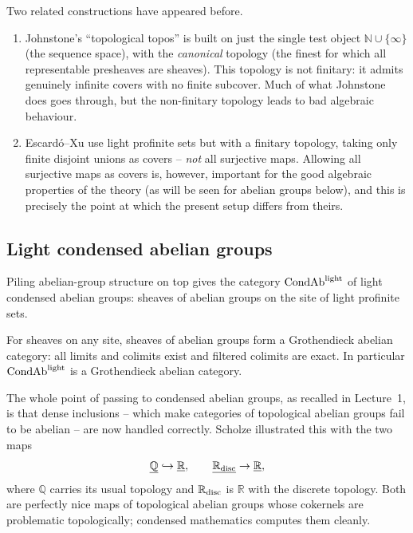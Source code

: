 \begin{remark}
\label{rmk:2:johnstone-escardo}
Two related constructions have appeared before.
\begin{enumerate}
\item Johnstone's ``topological topos'' \cite{Johnstone_1979} is built on just the
single test object $\mathbb{N}\cup\{\infty\}$ (the sequence space), with the
\emph{canonical} topology (the finest for which all representable presheaves are
sheaves). This topology is not finitary: it admits genuinely infinite covers with
no finite subcover. Much of what Johnstone does goes through, but the
non-finitary topology leads to bad algebraic behaviour.
\item Escard\'o--Xu \cite{Escard__2016} use light profinite sets but with a
finitary topology, taking only finite disjoint unions as covers -- \emph{not}
all surjective maps. Allowing all surjective maps as covers is, however,
important for the good algebraic properties of the theory (as will be seen for
abelian groups below), and this is precisely the point at which the present
setup differs from theirs.
\end{enumerate}
\end{remark}

\subsection{Light condensed abelian groups}

Piling abelian-group structure on top gives the category
$\mathrm{CondAb}^{\mathrm{light}}$ of light condensed abelian groups: sheaves of abelian groups on the
site of light profinite sets.

\begin{proposition}
\label{prop:2:grothendieck}
For sheaves on any site, sheaves of abelian groups form a Grothendieck abelian
category: all limits and colimits exist and filtered colimits are exact.
In particular $\mathrm{CondAb}^{\mathrm{light}}$ is a Grothendieck abelian category.
\end{proposition}

The whole point of passing to condensed abelian groups, as recalled in Lecture~1,
is that dense inclusions -- which make categories of topological abelian groups
fail to be abelian -- are now handled correctly. Scholze illustrated this with
the two maps
\begin{equation*}
\underline{\mathbb{Q}}\hookrightarrow\underline{\mathbb{R}},
\qquad
\underline{\mathbb{R}_{\mathrm{disc}}}\to\underline{\mathbb{R}},
\end{equation*}
where $\mathbb{Q}$ carries its usual topology and $\mathbb{R}_{\mathrm{disc}}$ is $\mathbb{R}$ with
the discrete topology. Both are perfectly nice maps of topological abelian
groups whose cokernels are problematic topologically; condensed mathematics
computes them cleanly.

